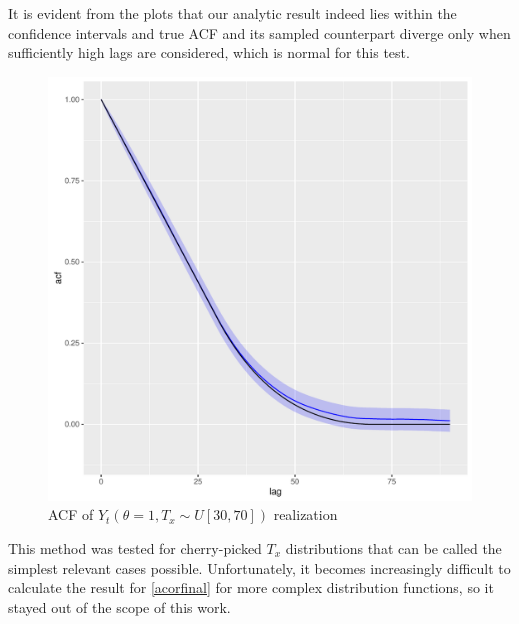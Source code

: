 \documentclass[12pt]{article}
\begin{document}
It is evident from the plots that our analytic result indeed lies within the confidence intervals and true ACF and its sampled counterpart diverge only when sufficiently high lags are considered, which is normal for this test.
\begin{figure}[H]
  \centering
    \includegraphics[width=\textwidth]{acfuth1}
   \caption{ACF of $Y_t(\theta =1, T_x\sim U[30,70])$ realization}\label{fig:acfuth1}  
\end{figure}
This method was tested for cherry-picked $T_x$ distributions that can be called the simplest relevant cases possible. Unfortunately, it becomes increasingly difficult to calculate the result for \eqref{acorfinal} for more complex distribution functions, so it stayed out of the scope of this work.
\end{document}
